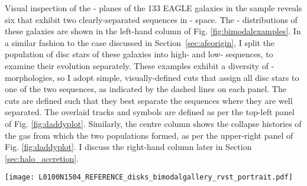 Visual inspection of the \afe{}-\feh{} planes of the 133 EAGLE galaxies in the sample reveals six that exhibit two clearly-separated sequences in \afe{}-\feh{} space. The \afe{}-\feh{} distributions of these galaxies are shown in the left-hand column of Fig. \ref{fig:bimodalexamples}. In a similar fashion to the case discussed in Section~\ref{sec:afeorigin}, I split the population of disc stars of these galaxies into high- and low-\afe{} sequences, to examine their evolution separately. These examples exhibit a diversity of \afe{}-\feh{} morphologies, so I adopt simple, visually-defined cuts that assign all disc stars to one of the two sequences, as indicated by the dashed lines on each panel. The cuts are defined such that they best separate the sequences where they are well separated. The overlaid tracks and symbols are defined as per the top-left panel of Fig. \ref{fig:daddyplot}. Similarly, the centre column shows the collapse histories of the gas from which the two populations formed, as per the upper-right panel of Fig. \ref{fig:daddyplot}. I discuss the right-hand column later in Section \ref{sec:halo_accretion}.

\begin{figure*}
\texttt{[image: L0100N1504\_REFERENCE\_disks\_bimodalgallery\_rvst\_portrait.pdf]}
\caption[Evolution of six example galaxies from Ref-L100N1504 which demonstrate bimodality in \afe{} at fixed \feh{}] {\label{fig:bimodalexamples} The evolution of the six galaxies from Ref-L100N1504 that exhibit bimodality in \afe{} at fixed \feh{}. Similarly to Fig. \ref{fig:daddyplot}, the left-hand column shows the \afe{}-\feh{} distribution of the disc stars of these galaxies as a 2-dimensional histogram. Here the disc stars are split into high- and low-\afe{} populations with a simple visually-defined cut, shown by the thin dashed line. The centre column shows the expansion, collapse and accretion onto the galaxy of the natal gas of these two populations. The right-hand column, discussed in Section \ref{sec:halo_accretion}, shows the total mass accretion history of the galaxies, i.e. $M_{200}(t)$. The red curve shows this quantity within the Ref-L100N1504 simulation, whilst the black curve denote the evolution of the same halo identified in its dark matter-only counterpart, DMONLY-L100N1504. Here, the dashed black curve denotes the typical accretion history of haloes with the same present-day mass as the DMONLY realisation of the halo, as parametrised by \citet{2015MNRAS.450.1514C}.} 
\end{figure*}

